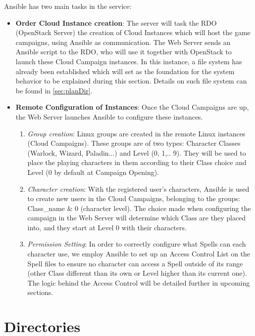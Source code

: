 \documentclass[a4paper,12pt]{report}
\begin{document}
Ansible has two main tasks in the service: 
\begin{itemize}
    \item \textbf{Order Cloud Instance creation}: The server will task the RDO (OpenStack Server) the creation of Cloud Instances which will host the game campaigns, using Ansible as communication. The Web Server sends an Ansible script to the RDO, who will use it together with OpenStack to launch these Cloud Campaign instances. In this instance, a file system has already been established which will set as the foundation for the system behavior to be explained during this section. Details on such file system can be found in \autoref{sec:planDir}.

    \item \textbf{Remote Configuration of Instances}: Once the Cloud Campaigns are up, the Web Server launches Ansible to configure these instances. 
    \begin{enumerate}
        \item \textit{Group creation}: Linux groups are created in the remote Linux instances (Cloud Campaigns). These groups are of two types: Character Classes (Warlock, Wizard, Paladin...) and Level (0, 1,.. 9). They will be used to place the playing characters in them according to their Class choice and Level (0 by default at Campaign Opening). 
        \item \textit{Character creation}: With the registered user's characters, Ansible is used to create new users in the Cloud Campaigns, belonging to the groups: Class\_name \& 0 (character level). The choice made when configuring the campaign in the Web Server will determine which Class are they placed into, and they start at Level 0 with their characters.
        \item \textit{Permission Setting}: In order to correctly configure what Spells can each character use, we employ Ansible to set up an Access Control List on the Spell files to ensure no character can access a Spell outside of its range (other Class different than its own or Level higher than its current one). The logic behind the Access Control will be detailed further in upcoming sections.
    \end{enumerate}
\end{itemize}



\section{Directories}
\label{sec:planDir}
\end{document}
